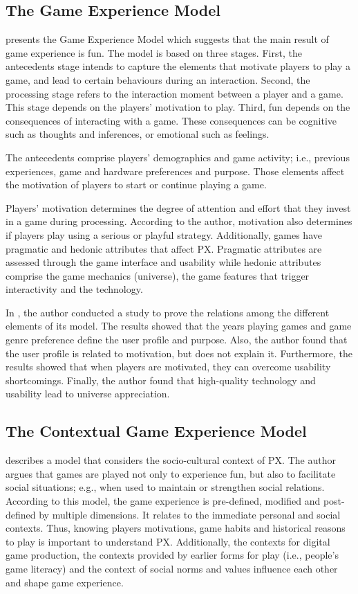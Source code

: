 \subsection{The Game Experience Model}
\textcite{Fernandez2008} presents the Game Experience Model which suggests that the main result of game experience is fun. The model is based on three stages. First, the antecedents stage intends to capture the elements that motivate players to play a game, and lead to certain behaviours during an interaction. Second, the processing stage refers to the interaction moment between a player and a game. This stage depends on the players' motivation to play. Third, fun depends on the consequences of interacting with a game. These consequences can be cognitive such as thoughts and inferences, or emotional such as feelings.

The antecedents comprise players' demographics and game activity; i.e., previous experiences, game and hardware preferences and purpose. Those elements affect the motivation of players to start or continue playing a game.

Players' motivation determines the degree of attention and effort that they invest in a game during processing. According to the author, motivation also determines if players play using a serious or playful strategy. Additionally, games have pragmatic and hedonic attributes that affect \ac{PX}. Pragmatic attributes are assessed through the game interface and usability while hedonic attributes comprise the game mechanics (universe), the game features that trigger interactivity and the technology.

In \autocite{Fernandez}, the author conducted a study to prove the relations among the different elements of its model. The results showed that the years playing games and game genre preference define the user profile and purpose. Also, the author found that the user profile is related to motivation, but does not explain it. Furthermore, the results showed that when players are motivated, they can overcome usability shortcomings. Finally, the author found that high-quality technology and usability lead to universe appreciation.

\subsection{The Contextual Game Experience Model}
\textcite{Mayra} describes a model that considers the socio-cultural context of \ac{PX}. The author argues that games are played not only to experience fun, but also to facilitate social situations; e.g., when used to maintain or strengthen social relations. According to this model, the game experience is pre-defined, modified and post-defined by multiple dimensions. It relates to the immediate personal and social contexts. Thus, knowing players motivations, game habits and historical reasons to play is important to understand \ac{PX}. Additionally, the contexts for digital game production, the contexts provided by earlier forms for play (i.e., people's game literacy) and the context of social norms and values influence each other and shape game experience.

